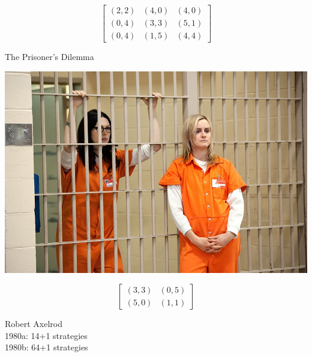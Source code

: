 \documentclass{beamer}
\begin{document}
\begin{frame}{}
 \Huge
 \[
\begin{bmatrix}
  (2,2) & (4,0) & (4,0)  \\
  (0,4) & (3,3) & (5,1) \\
  (0,4) & (1,5) & (4,4)
\end{bmatrix}
\]
\end{frame}

\begin{frame}
\begin{center}
\Huge{The Prisoner's Dilemma}
\end{center}
\end{frame}

\begin{frame}
    \begin{center}
        \includegraphics[width=1\textwidth]{static/prisoners.jpg}
    \end{center}
\end{frame}

\begin{frame}{}
 \Huge
 \[
\begin{bmatrix}
  (3,3) & (0,5)  \\
  (5,0) & (1,1)
\end{bmatrix}
\]
\end{frame}

\begin{frame}
    \begin{center}
      \Large{ Robert Axelrod} \\
      \Large{ 1980a: 14+1 strategies} \\
      \Large{ 1980b: 64+1 strategies}

    \end{center}
\end{frame}
\end{document}
